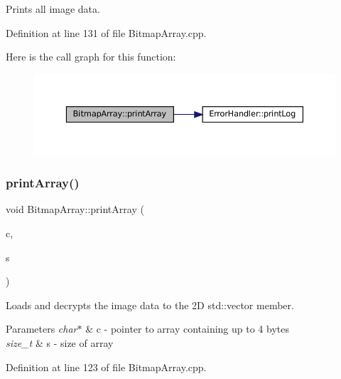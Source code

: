 Prints all image data. 



Definition at line 131 of file Bitmap\+Array.\+cpp.

Here is the call graph for this function\+:
\nopagebreak
\begin{figure}[H]
\begin{center}
\leavevmode
\includegraphics[width=350pt]{classBitmapArray_a0580ddeedca7f59fd8d43ec92e6bb4a1_cgraph}
\end{center}
\end{figure}
\mbox{\label{classBitmapArray_a99a8a164e51e29407f24dab4752232c1}} 
\subsubsection{\texorpdfstring{printArray()}{printArray()}\hspace{0.1cm}{\footnotesize\ttfamily [2/2]}}
{\footnotesize\ttfamily void Bitmap\+Array\+::print\+Array (\begin{DoxyParamCaption}\item[{char $\ast$}]{c,  }\item[{size\+\_\+t}]{s }\end{DoxyParamCaption})\hspace{0.3cm}{\ttfamily [private]}}



Loads and decrypts the image data to the 2D std\+::vector member. 


\begin{DoxyParams}{Parameters}
{\em char$\ast$} & c -\/ pointer to array containing up to 4 bytes \\
\hline
{\em size\+\_\+t} & s -\/ size of array \\
\hline
\end{DoxyParams}


Definition at line 123 of file Bitmap\+Array.\+cpp.

